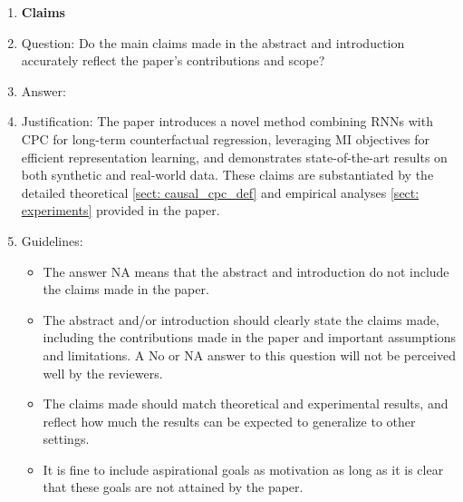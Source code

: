\documentclass{article}
\theoremstyle{plain}
\theoremstyle{definition}
\theoremstyle{remark}
\begin{document}
 



\begin{enumerate}

\item {\bf Claims}
    \item[] Question: Do the main claims made in the abstract and introduction accurately reflect the paper's contributions and scope?
    \item[] Answer: \answerYes{} 
    \item[] Justification: The paper introduces a novel method combining RNNs with CPC for long-term counterfactual regression, leveraging MI objectives for efficient representation learning, and demonstrates state-of-the-art results on both synthetic and real-world data. These claims are substantiated by the detailed theoretical \ref{sect: causal_cpc_def} and empirical analyses \ref{sect: experiments} provided in the paper.
    \item[] Guidelines:
    \begin{itemize}
        \item The answer NA means that the abstract and introduction do not include the claims made in the paper.
        \item The abstract and/or introduction should clearly state the claims made, including the contributions made in the paper and important assumptions and limitations. A No or NA answer to this question will not be perceived well by the reviewers. 
        \item The claims made should match theoretical and experimental results, and reflect how much the results can be expected to generalize to other settings. 
        \item It is fine to include aspirational goals as motivation as long as it is clear that these goals are not attained by the paper. 
    \end{itemize}


\end{enumerate}
\end{document}
